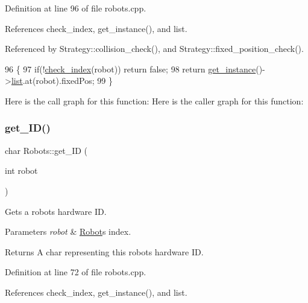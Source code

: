Definition at line 96 of file robots.\+cpp.



References check\+\_\+index, get\+\_\+instance(), and list.



Referenced by Strategy\+::collision\+\_\+check(), and Strategy\+::fixed\+\_\+position\+\_\+check().


\begin{DoxyCode}
96                                    \{
97     \textcolor{keywordflow}{if}(!\hyperlink{robots_8hpp_ae3e6ae8f87cdc750c0b99bc609d9ae43}{check\_index}(robot)) \textcolor{keywordflow}{return} \textcolor{keyword}{false};
98     \textcolor{keywordflow}{return} \hyperlink{class_robots_a589bce74db5f34af384952d48435168f}{get\_instance}()->\hyperlink{class_robots_a2c6b77265028f82a4342ca1ef15ed305}{list}.at(robot).fixedPos;
99 \}
\end{DoxyCode}
Here is the call graph for this function\+:
Here is the caller graph for this function\+:
\mbox{\label{class_robots_a306bb88b37b41cff35018d51d8228d65}} 
\subsubsection{\texorpdfstring{get\+\_\+\+I\+D()}{get\_ID()}}
{\footnotesize\ttfamily char Robots\+::get\+\_\+\+ID (\begin{DoxyParamCaption}\item[{int}]{robot }\end{DoxyParamCaption})\hspace{0.3cm}{\ttfamily [static]}}

Gets a robot\textquotesingle{}s hardware ID. 
\begin{DoxyParams}{Parameters}
{\em robot} & \hyperlink{struct_robots_1_1_robot}{Robot}\textquotesingle{}s index. \\
\hline
\end{DoxyParams}
\begin{DoxyReturn}{Returns}
A char representing this robot\textquotesingle{}s hardware ID. 
\end{DoxyReturn}


Definition at line 72 of file robots.\+cpp.



References check\+\_\+index, get\+\_\+instance(), and list.



